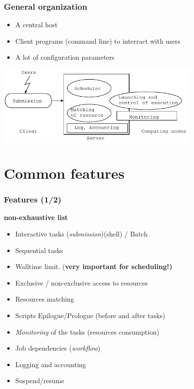 \documentclass{beamer}
\begin{document}
\begin{frame}
	\frametitle{General organization}

	\begin{itemize}
		\item A central host
		\item Client programs (command line) to interract with users
		\item A lot of configuration parameters
	\end{itemize}

	\begin{center}
		\includegraphics[height=4cm]{Batch_organization.pdf}
	\end{center}

\end{frame}

\section{Common features}

\begin{frame}
\frametitle{Features (1/2)}
	{\bf non-exhaustive list}
		\begin{itemize}
		\item Interactive tasks ({\em submission})(shell) / Batch
		\item Sequential tasks
		\item Walltime limit. ({\bf very important for scheduling!)}
		\item Exclusive / non-exclusive access to resources 
		\item Resources matching
		\item Scripts Epilogue/Prologue (before and after tasks)
		\item {\em Monitoring} of the tasks (resources consumption)
		\item Job dependencies ({\em workflow})
		\item Logging and accounting
		\item Suspend/resume 
	\end{itemize}
\end{frame}
\end{document}
